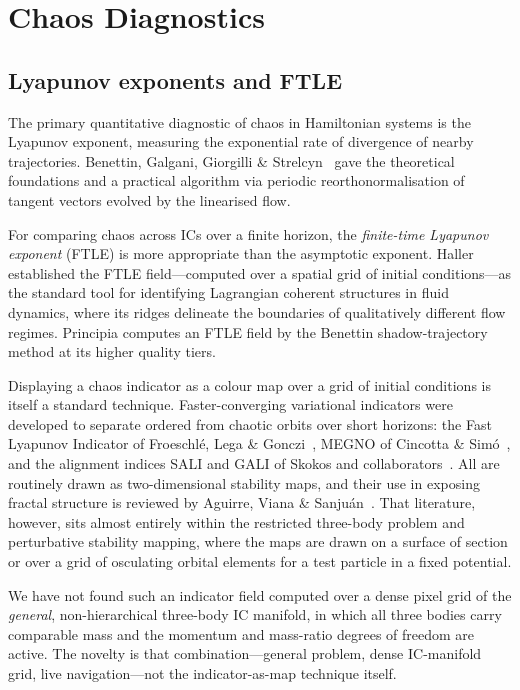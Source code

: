 \documentclass[11pt,a4paper]{article}
\begin{document}
\section{Chaos Diagnostics}
\label{sec:chaos}

\subsection{Lyapunov exponents and FTLE}

The primary quantitative diagnostic of chaos in Hamiltonian systems is the Lyapunov exponent,
measuring the exponential rate of divergence of nearby trajectories.  Benettin, Galgani,
Giorgilli \& Strelcyn~\cite{benettin1980} gave the theoretical foundations and a practical
algorithm via periodic reorthonormalisation of tangent vectors evolved by the linearised flow.

For comparing chaos across ICs over a finite horizon, the \emph{finite-time Lyapunov exponent}
(FTLE) is more appropriate than the asymptotic exponent.  Haller~\cite{haller2001} established the
FTLE field---computed over a spatial grid of initial conditions---as the standard tool for
identifying Lagrangian coherent structures in fluid dynamics, where its ridges delineate the
boundaries of qualitatively different flow regimes.  Principia computes an FTLE field by the
Benettin shadow-trajectory method at its higher quality tiers.

Displaying a chaos indicator as a colour map over a grid of initial conditions is itself a
standard technique.  Faster-converging variational indicators were developed to separate ordered
from chaotic orbits over short horizons: the Fast Lyapunov Indicator of Froeschl\'{e}, Lega \&
Gonczi~\cite{froeschle1997}, MEGNO of Cincotta \& Sim\'{o}~\cite{cincotta2000}, and the alignment
indices SALI and GALI of Skokos and collaborators~\cite{skokos2001,skokos2007}.  All are routinely
drawn as two-dimensional stability maps, and their use in exposing fractal structure is reviewed
by Aguirre, Viana \& Sanju\'{a}n~\cite{aguirre2009}.  That literature, however, sits almost
entirely within the restricted three-body problem and perturbative stability mapping, where the
maps are drawn on a surface of section or over a grid of osculating orbital elements for a test
particle in a fixed potential.

We have not found such an indicator field computed over a dense pixel grid of the
\emph{general}, non-hierarchical three-body IC manifold, in which all three bodies carry
comparable mass and the momentum and mass-ratio degrees of freedom are active.  The novelty is
that combination---general problem, dense IC-manifold grid, live navigation---not the
indicator-as-map technique itself.
\end{document}
